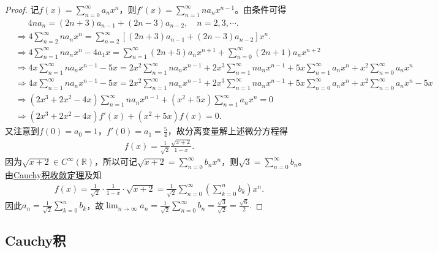 \documentclass[../../main.tex]{subfiles}
\begin{document}
\begin{proof}
记$f(x) = \sum_{n=0}^{\infty} a_n x^n$，则$f'(x) = \sum_{n=1}^{\infty} n a_n x^{n-1}$。由条件可得
\begin{align*}
&\quad \,\,\, 4n a_n = (2n+3)a_{n-1} + (2n-3)a_{n-2}, \quad n=2,3,\cdots .
\\
&\Rightarrow 4\sum_{n=2}^{\infty} n a_n x^n = \sum_{n=2}^{\infty} \left[ (2n+3)a_{n-1} + (2n-3)a_{n-2} \right] x^n.
\\
&\Rightarrow 4\sum_{n=1}^{\infty} n a_n x^n - 4a_1 x = \sum_{n=1}^{\infty} (2n+5)a_n x^{n+1} + \sum_{n=0}^{\infty} (2n+1)a_n x^{n+2}
\\
&\Rightarrow 4x\sum_{n=1}^{\infty} n a_n x^{n-1} - 5x = 2x^2\sum_{n=1}^{\infty} n a_n x^{n-1} + 2x^3\sum_{n=1}^{\infty} n a_n x^{n-1} + 5x\sum_{n=1}^{\infty} a_n x^n + x^2\sum_{n=0}^{\infty} a_n x^n
\\
&\Rightarrow 4x\sum_{n=1}^{\infty} n a_n x^{n-1} - 5x = 2x^2\sum_{n=1}^{\infty} n a_n x^{n-1} + 2x^3\sum_{n=1}^{\infty} n a_n x^{n-1} + 5x\sum_{n=0}^{\infty} a_n x^n + x^2\sum_{n=0}^{\infty} a_n x^n - 5x
\\
&\Rightarrow (2x^3 + 2x^2 - 4x) \sum_{n=1}^{\infty} n a_n x^{n-1} + (x^2 + 5x) \sum_{n=1}^{\infty} a_n x^n = 0
\\
&\Rightarrow (2x^3 + 2x^2 - 4x) f'(x) + (x^2 + 5x) f(x) = 0.
\end{align*}
又注意到$f(0) = a_0 = 1$，$f'(0) = a_1 = \frac{5}{4}$，故分离变量解上述微分方程得
\begin{align*}
f(x) = \frac{1}{\sqrt{2}} \frac{\sqrt{x+2}}{1-x}.
\end{align*}
因为$\sqrt{x+2} \in C^{\infty}(\mathbb{R})$，所以可记$\sqrt{x+2} = \sum_{n=0}^{\infty} b_n x^n$，则$\sqrt{3} = \sum_{n=0}^{\infty} b_n$。由\hyperref[theorem:Cauchy积收敛定理]{Cauchy积收敛定理}及知
\begin{align*}
f(x) = \frac{1}{\sqrt{2}} \cdot \frac{1}{1-x} \cdot \sqrt{x+2} = \frac{1}{\sqrt{2}} \sum_{n=0}^{\infty} \left( \sum_{k=0}^n b_k \right) x^n.
\end{align*}
因此$a_n = \frac{1}{\sqrt{2}} \sum_{k=0}^n b_k$，故$\lim_{n\rightarrow \infty} a_n = \frac{1}{\sqrt{2}} \sum_{n=0}^{\infty} b_n = \frac{\sqrt{3}}{\sqrt{2}} = \frac{\sqrt{6}}{2}.$

\end{proof}








\subsection{Cauchy积}
\end{document}
